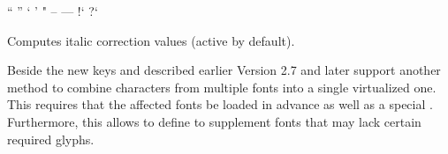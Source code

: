           \unless \iffalse
            \begintabulate [rlrl]
              \beginrow ``  \newcell  {\inlinecode !``! } \newcell  ''  \newcell  {\inlinecode !''!} \endrow
              \beginrow `   \newcell  {\inlinecode !`!  } \newcell  '   \newcell  {\inlinecode !'! } \endrow
              \beginrow "   \newcell  {\inlinecode !"!  } \newcell  --  \newcell  {\inlinecode !--!} \endrow
              \beginrow --- \newcell  {\inlinecode !---!} \newcell  !`  \newcell  {\inlinecode ?!`?} \endrow
              \beginrow ?`  \newcell  {\inlinecode !?`! } \newcell      \newcell                     \endrow
            \endtabulate
          \else
            \startframed [frame=off,width=broad,align=middle]
              \startframed [frame=off,width=\dimexpr(\textwidth/2)]
                \startxtable [align=middle]
                    \startxrow \startxcell ``  \stopxcell \startxcell  {}  \stopxcell \startxcell  ''  \stopxcell \startxcell  {}  \stopxcell \stopxrow
                    \startxrow \startxcell `   \stopxcell \startxcell  {}   \stopxcell \startxcell  '   \stopxcell \startxcell  {}   \stopxcell \stopxrow
                    \startxrow \startxcell "   \stopxcell \startxcell  {}   \stopxcell \startxcell  --  \stopxcell \startxcell  \inlinecode {--}  \stopxcell \stopxrow
                    \startxrow \startxcell --- \stopxcell \startxcell  \inlinecode {---} \stopxcell \startxcell  !`  \stopxcell \startxcell  {}  \stopxcell \stopxrow
                    \startxrow \startxcell ?`  \stopxcell \startxcell  {}  \stopxcell \startxcell      \stopxcell \startxcell                    \stopxcell \stopxrow
                \stopxtable
              \stopframed
            \stopframed
          \fi
  \endaltitem

          Computes italic correction values (active by default).
  \endaltitem

\enddescriptions

\endsubsection

\endsection

Beside the new keys  and  described earlier
Version 2.7 and later support another method to combine characters from multiple fonts into a
single virtualized one. This requires that the affected fonts be loaded in
advance as well as a special . Furthermore, this
allows to define  to supplement fonts that may lack
certain required glyphs.


